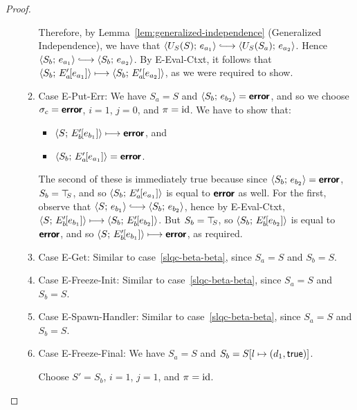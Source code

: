 \begin{proof}
\begin{enumerate}
\begin{enumerate}
      Therefore, by Lemma~\ref{lem:generalized-independence}
      (Generalized Independence), we have that
      $\config{U_S(S)}{e_{a_1}} \parstepsto
      \config{U_S(S_a)}{e_{a_2}}$.  Hence $\config{S_b}{e_{a_1}}
      \parstepsto \config{S_b}{e_{a_2}}$.  By {\sc E-Eval-Ctxt}, it
      follows that $\langle S_b;\, E'_a\hspace{-1mm}\left[e_{a_1}\right] \rangle \longmapsto
      \langle S_b;\, E'_a\hspace{-1mm}\left[e_{a_2}\right] \rangle$, as we were required to
      show.

    \item \label{slqc-beta-put-err}Case {\sc E-Put-Err}: We have $S_a
      = S$ and $\langle S_b;\, e_{b_2} \rangle = \textbf{\textsf{error}}$, and so we choose
      $\sigma_c = \textbf{\textsf{error}}$, $i = 1$, $j = 0$, and $\pi = \mathrm{id}$.  We have
      to show that:
      \begin{itemize}
      \item $\langle S;\, E'_b\hspace{-1mm}\left[e_{b_1}\right] \rangle \longmapsto \textbf{\textsf{error}}$,
        and
      \item
        $\langle S_b;\, E'_a\hspace{-1mm}\left[e_{a_1}\right] \rangle = \textbf{\textsf{error}}$.
      \end{itemize}

      The second of these is immediately true because since
      $\langle S_b;\, e_{b_2} \rangle = \textbf{\textsf{error}}$, $S_b = \top\hspace{-0.85mm}_{S}$, and so
      $\langle S_b;\, E'_a\hspace{-1mm}\left[e_{a_1}\right] \rangle$ is equal to $\textbf{\textsf{error}}$ as
      well.  For the first, observe that $\config{S}{e_{b_1}}
      \parstepsto \config{S_b}{e_{b_2}}$, hence by {\sc E-Eval-Ctxt},
      $\langle S;\, E'_b\hspace{-1mm}\left[e_{b_1}\right] \rangle \longmapsto
      \langle S_b;\, E'_b\hspace{-1mm}\left[e_{b_2}\right] \rangle$.  But $S_b = \top\hspace{-0.85mm}_{S}$, so
      $\langle S_b;\, E'_b\hspace{-1mm}\left[e_{b_2}\right] \rangle$ is equal to $\textbf{\textsf{error}}$,
      and so $\langle S;\, E'_b\hspace{-1mm}\left[e_{b_1}\right] \rangle \longmapsto
      \textbf{\textsf{error}}$, as required.

    \item \label{slqc-beta-get}Case {\sc E-Get}: Similar to
      case~\ref{slqc-beta-beta}, since $S_a = S$ and $S_b = S$.
    \item \label{slqc-beta-freeze-init}Case {\sc E-Freeze-Init}:
      Similar to case~\ref{slqc-beta-beta}, since $S_a = S$ and $S_b =
      S$.
    \item \label{slqc-beta-spawn-handler}Case {\sc E-Spawn-Handler}:
      Similar to case~\ref{slqc-beta-beta}, since $S_a = S$ and $S_b =
      S$.
    \item \label{slqc-beta-freeze-final}Case {\sc E-Freeze-Final}: We
      have $S_a = S$ and $S_b = S[l \mapsto (d_1, \textsf{true})]$.

      Choose $S' = S_b$, $i = 1$, $j = 1$, and $\pi = \mathrm{id}$.


\end{enumerate}
\end{enumerate}
\end{proof}
